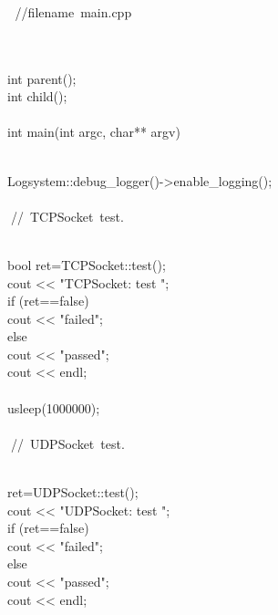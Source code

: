 \documentclass{article}
\begin{document}
\\
\strut\\
\strut\goodbreak
{}\strut\nopagebreak\\
 
\hbox{//$$filename main.cpp}\strut\\
 
\\
 int parent();
\\
 int child();
\\
 
\\
 int main(int argc, char** argv) 
\\
 {
\\
         Logsystem::debug_logger()->enable_logging();
\\
 
\\
         
\hbox{// TCPSocket test.}\strut\\
         bool ret=TCPSocket::test();
\\
         cout << "TCPSocket: test ";
\\
         if (ret==false)
\\
                 cout << "failed";
\\
         else 
\\
                 cout << "passed";
\\
         cout << endl;
\\
 
\\
         usleep(1000000);
\\
 
\\
         
\hbox{// UDPSocket test.}\strut\\
         ret=UDPSocket::test();
\\
         cout << "UDPSocket: test ";
\\
         if (ret==false)
\\
                 cout << "failed";
\\
         else 
\\
                 cout << "passed";
\\
         cout << endl;
\\
 
\\
}
\end{document}

